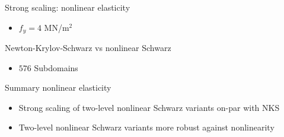 \begin{frame}{Strong scaling: nonlinear elasticity}
	\begin{itemize}
		\item $f_y = 4$ MN/m$^{2}$
	\end{itemize}
	\begin{figure}
		\centering
		
		\label{fig:strong-scalability-elascticity}
	\end{figure}
\end{frame}

\begin{frame}{Newton-Krylov-Schwarz vs nonlinear Schwarz}
	\begin{itemize}
		\item $576$ Subdomains
	\end{itemize}
	\begin{figure}
		\centering
		
		\label{fig:nks-vs-nls}
	\end{figure}
\end{frame}

 \begin{frame}{Summary nonlinear elasticity}
   \begin{itemize}
     \item Strong scaling of two-level nonlinear Schwarz variants on-par with NKS
     \item Two-level nonlinear Schwarz variants more robust against nonlinearity
   \end{itemize}
 \end{frame}
